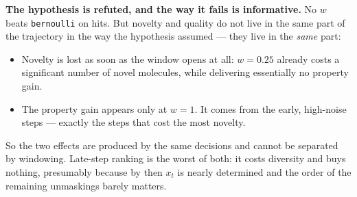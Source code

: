 \documentclass[11pt]{article}
\begin{document}
\begin{table}[htbp]
\centering
\footnotesize
\setlength{\tabcolsep}{4pt}
\caption{QED: the CV ranking confined to $t \leq w$, paired against $w=0$.}
\label{tab:conf-window}
\end{table}


\textbf{The hypothesis is refuted, and the way it fails is informative.} No $w$
beats \texttt{bernoulli} on hits. But novelty and quality do not live in the same
part of the trajectory in the way the hypothesis assumed --- they live in the
\emph{same} part:

\begin{itemize}
  \item Novelty is lost as soon as the window opens at all: $w=0.25$ already
        costs a significant number of novel molecules, while delivering
        essentially no property gain.
  \item The property gain appears only at $w=1$. It comes from the early,
        high-noise steps --- exactly the steps that cost the most novelty.
\end{itemize}

So the two effects are produced by the same decisions and cannot be separated by
windowing. Late-step ranking is the worst of both: it costs diversity and buys
nothing, presumably because by then $x_t$ is nearly determined and the order of
the remaining unmaskings barely matters.
\end{document}
